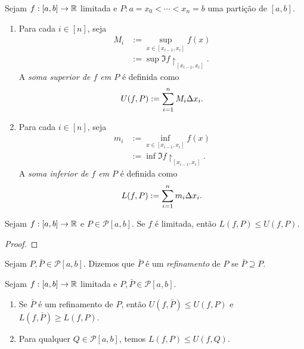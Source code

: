 \begin{definition} \label{defi:somassupinf}
    Sejam $f : [a,b] \to \mathbb{R}$ limitada e $P : a = x_0 < \cdots < x_n = b$ uma partição de $[a,b]$.
        \begin{enumerate}[leftmargin=*, align=left, label=\textbf{(\alph*)}]
            \item Para cada $i \in [n]$, seja
                \begin{align*}
                    M_i &:= \sup_{x \in [x_{i-1}, x_i]}{f(x)} \\ 
                    &:= \sup \Im f \restriction_{[x_{i-1}, x_i]}.
                \end{align*}
            A \emph{soma superior de $f$ em $P$} é definida como
                \[ \displaystyle
                    U(f,P) := \sum_{i=1}^{n}{M_i \Delta{x_i}}.
                \]
            \item Para cada $i \in [n]$, seja
                \begin{align*}
                    m_i &:= \inf_{x \in [x_{i-1}, x_i]}{f(x)} \\ 
                    &:= \inf \Im f \restriction_{[x_{i-1}, x_i]}.
                \end{align*}
            A \emph{soma inferior de $f$ em $P$} é definida como
                \[ \displaystyle
                    L(f,P) := \sum_{i=1}^{n}{m_i \Delta{x_i}}.
                \]
        \end{enumerate}
\end{definition}

\begin{proposition}
    Sejam $f:[a,b] \to \mathbb{R}$ e $P \in \mathcal{P}[a,b]$. Se $f$ é limitada, então $L(f,P) \leq U(f,P)$.
\end{proposition}

\begin{proof}
    \blackproof
\end{proof}

\begin{definition}
    Sejam $P, \bar{P} \in \mathcal{P}[a,b]$. Dizemos que $\bar{P}$ é um \emph{refinamento} de $P$ se $\bar{P} \supseteq P$.
\end{definition}

\begin{proposition}
    Sejam $f : [a,b] \to \mathbb{R}$ limitada e $P, \bar{P} \in \mathcal{P}[a,b]$.
        \begin{enumerate}[leftmargin=*, align=left, label=\textbf{(\alph*)}]
            \item Se $\bar{P}$ é um refinamento de $P$, então
                $
                    U(f,\bar{P}) \leq U(f,P)
                $
            e
                $
                    L(f,\bar{P}) \geq L(f,P)
                $.
            \item Para qualquer $Q \in \mathcal{P}[a,b]$, temos $L(f,P) \leq U(f,Q)$.
        \end{enumerate}
\end{proposition}

